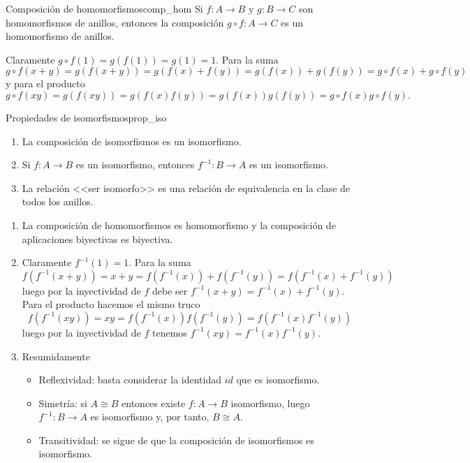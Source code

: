 \begin{proposition}{Composición de homomorfismos}{comp_hom}
    Si \(f: A \to B\) y \(g: B \to C\) son homomorfismos de anillos, entonces la composición \(g \circ f: A \to C\) es un homomorfismo de anillos.
\end{proposition}

\begin{proofbox}
    Claramente $g \circ f (1) = g(f(1)) = g(1) = 1$. Para la suma
    \[
    g \circ f (x + y) = g(f(x + y)) = g(f(x) + f(y)) = g(f(x)) + g(f(y)) = g \circ f (x) + g \circ f (y)
    \]
    y para el producto
    \[
    g \circ f (xy) = g(f(xy)) = g(f(x)f(y)) = g(f(x))g(f(y)) = g \circ f (x) g \circ f (y).
    \]
\end{proofbox}

\begin{proposition}{Propiedades de isomorfismos}{prop_iso}
    \begin{enumerate}
        \item La composición de isomorfismos es un isomorfismo.
        \item Si \(f: A \to B\) es un isomorfismo, entonces \(f^{-1}: B \to A\) es un isomorfismo.
        \item La relación <<ser isomorfo>> es una relación de equivalencia en la clase de todos los anillos.
    \end{enumerate}
\end{proposition}

\begin{proofbox}
    \begin{enumerate}
        \item La composición de homomorfismos es homomorfismo y la composición de aplicaciones biyectivas es biyectiva.

        \item Claramente $f^{-1}(1) = 1$. Para la suma
        \[
        f(f^{-1}(x + y)) = x + y = f(f^{-1}(x)) + f(f^{-1}(y)) = f(f^{-1}(x) + f^{-1}(y))
        \]
        luego por la inyectividad de $f$ debe ser $f^{-1}(x + y) = f^{-1}(x) + f^{-1}(y)$.
        Para el producto hacemos el mismo truco
        \[
        f(f^{-1}(xy)) = xy = f(f^{-1}(x))f(f^{-1}(y)) = f(f^{-1}(x)f^{-1}(y))
        \]
        luego por la inyectividad de $f$ tenemos $f^{-1}(xy) = f^{-1}(x) f^{-1}(y)$.
        \item Resumidamente
        \begin{itemize}
            \item Reflexividad: basta considerar la identidad $id$ que es isomorfismo.

            \item Simetría: si $A \cong B$ entonces existe $f: A \to B$ isomorfismo, luego $f^{-1} : B \to A$ es isomorfismo y, por tanto, $B \cong A$.

            \item Transitividad: se sigue de que la composición de isomorfismos es isomorfismo.
        \end{itemize}
    \end{enumerate}
\end{proofbox}

